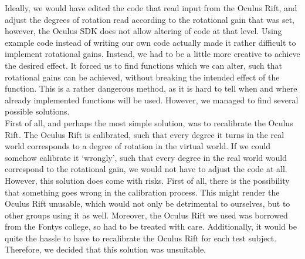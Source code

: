 Ideally, we would have edited the code that read input from the Oculus Rift, and adjust the degrees of rotation read according to the rotational gain that was set, however, the Oculus SDK does not allow altering of code at that level.
Using example code instead of writing our own code actually made it rather difficult to implement rotational gains.
Instead, we had to be a little more creative to achieve the desired effect.
It forced us to find functions which we can alter, such that rotational gains can be achieved, without breaking the intended effect of the function.
This is a rather dangerous method, as it is hard to tell when and where already implemented functions will be used.
However, we managed to find several possible solutions. \\

First of all, and perhaps the most simple solution, was to recalibrate the Oculus Rift.
The Oculus Rift is calibrated, such that every degree it turns in the real world corresponds to a degree of rotation in the virtual world.
If we could somehow calibrate it `wrongly', such that every degree in the real world would correspond to the rotational gain, we would not have to adjust the code at all.
However, this solution does come with risks.
First of all, there is the possibility that something goes wrong in the calibration process.
This might render the Oculus Rift unusable, which would not only be detrimental to ourselves, but to other groups using it as well.
Moreover, the Oculus Rift we used was borrowed from the Fontys college, so had to be treated with care.
Additionally, it would be quite the hassle to have to recalibrate the Oculus Rift for each test subject.
Therefore, we decided that this solution was unsuitable.\\

